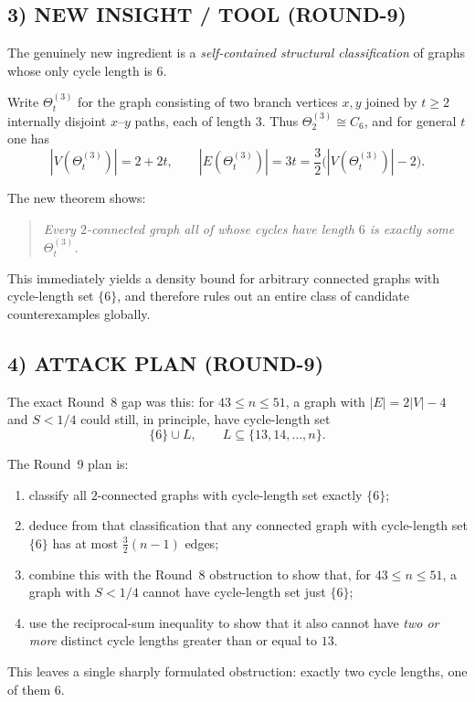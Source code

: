 \subsection*{3) NEW INSIGHT / TOOL (ROUND-9)}

The genuinely new ingredient is a \emph{self-contained structural classification} of graphs whose only cycle length is $6$.

Write $\Theta_t^{(3)}$ for the graph consisting of two branch vertices $x,y$ joined by $t\ge 2$ internally disjoint $x$--$y$ paths, each of length $3$.
Thus $\Theta_2^{(3)}\cong C_6$, and for general $t$ one has
\[
|V(\Theta_t^{(3)})|=2+2t,
\qquad
|E(\Theta_t^{(3)})|=3t=\frac32\bigl(|V(\Theta_t^{(3)})|-2\bigr).
\]

The new theorem shows:
\begin{quote}
\emph{Every $2$-connected graph all of whose cycles have length $6$ is exactly some $\Theta_t^{(3)}$.}
\end{quote}
This immediately yields a density bound for arbitrary connected graphs with cycle-length set $\{6\}$, and therefore rules out an entire class of candidate counterexamples globally.

\subsection*{4) ATTACK PLAN (ROUND-9)}

The exact Round~8 gap was this: for $43\le n\le 51$, a graph with $|E|=2|V|-4$ and $S<1/4$ could still, in principle, have cycle-length set
\[
\{6\}\cup L,
\qquad L\subseteq \{13,14,\dots,n\}.
\]

The Round~9 plan is:
\begin{enumerate}
\item classify all $2$-connected graphs with cycle-length set exactly $\{6\}$;
\item deduce from that classification that any connected graph with cycle-length set $\{6\}$ has at most $\frac32(n-1)$ edges;
\item combine this with the Round~8 obstruction to show that, for $43\le n\le 51$, a graph with $S<1/4$ cannot have cycle-length set just $\{6\}$;
\item use the reciprocal-sum inequality to show that it also cannot have \emph{two or more} distinct cycle lengths greater than or equal to $13$.
\end{enumerate}

This leaves a single sharply formulated obstruction: exactly two cycle lengths, one of them $6$.

